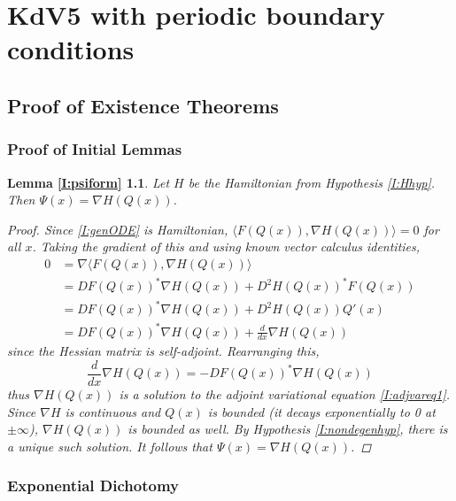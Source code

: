 \documentclass[thesis.tex]{subfiles}
\begin{document}
\chapter{KdV5 with periodic boundary conditions}

\section{Proof of Existence Theorems}

\subsection{Proof of Initial Lemmas}

\newtheorem*{lemma:psiform}{Lemma \ref{I:psiform}}
\begin{lemma:psiform}
Let $H$ be the Hamiltonian from Hypothesis \ref{I:Hhyp}. Then $\Psi(x) = \nabla H(Q(x))$.
\begin{proof}
Since \eqref{I:genODE} is Hamiltonian, $\langle F(Q(x)), \nabla H(Q(x)) \rangle = 0$ for all $x$. Taking the gradient of this and using known vector calculus identities,
\begin{align*}
0 &= \nabla \langle F(Q(x)), \nabla H(Q(x)) \rangle \\
&= D F(Q(x))^* \nabla H(Q(x)) + D^2 H(Q(x))^* F(Q(x)) \\
&= D F(Q(x))^* \nabla H(Q(x)) + D^2 H(Q(x)) Q'(x) \\
&= D F(Q(x))^* \nabla H(Q(x)) + \frac{d}{dx} \nabla H(Q(x))
\end{align*}
since the Hessian matrix is self-adjoint. Rearranging this,
\begin{equation*}
\frac{d}{dx} \nabla H(Q(x)) = -D F(Q(x))^* \nabla H(Q(x)) 
\end{equation*}
thus $\nabla H(Q(x))$ is a solution to the adjoint variational equation \eqref{I:adjvareq1}. Since $\nabla H$ is continuous and $Q(x)$ is bounded (it decays exponentially to 0 at $\pm \infty$), $\nabla H(Q(x))$ is bounded as well. By Hypothesis \ref{I:nondegenhyp}, there is a unique such solution. It follows that $\Psi(x) = \nabla H(Q(x))$.
\end{proof}
\end{lemma:psiform}

\subsection{Exponential Dichotomy}
\end{document}

